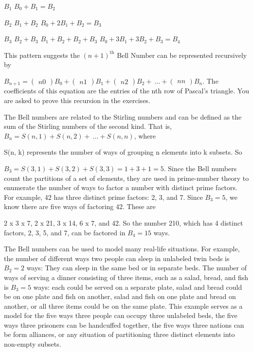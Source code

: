 \documentclass[10pt,letter]{article}
\begin{document}
\(B_{1}\) \(B_{0} + B_{1} = B_{2}\)

\(B_{2}\) \(B_{1} + B_{2}\) \(B_{0} + 2B_{1} + B_{2} = B_{3}\)

\(B_{3}\) \(B_{2} + B_{3}\) \(B_{1} + B_{2} + B_{2} + B_{3}\)
\(B_{0} + 3B_{1} + 3B_{2} + B_{3} = B_{4}\)

This pattern suggests the \({(n + 1)}^{\text{th}}\) Bell Number can be
represented recursively by

\(B_{n + 1} =

\begin{pmatrix}
n 
0 
\end{pmatrix}
B_{0} +

\begin{pmatrix}
n 
1 
\end{pmatrix}
B_{1} +

\begin{pmatrix}
n 
2 
\end{pmatrix}
B_{2} + \ \ldots +

\begin{pmatrix}
n 
n 
\end{pmatrix}
B_{n}\). The coefficients of this equation are the entries
of the nth row of Pascal's triangle. You are asked to prove this
recursion in the exercises.

The Bell numbers are related to the Stirling numbers and can be defined
as the sum of the Stirling numbers of the second kind. That is,
\(B_{n} = S\left( n,1 \right) + S\left( n,2 \right) + \ \ldots + S(n,n)\),
where

S(n, k) represents the number of ways of grouping n elements into k
subsets. So

\(B_{3} = S\left( 3,1 \right) + S\left( 3,2 \right) + S\left( 3,3 \right) = 1 + 3 + 1 = 5.\)
Since the Bell numbers count the partitions of a set of elements, they
are used in prime-number theory to enumerate the number of ways to
factor a number with distinct prime factors. For example, 42 has three
distinct prime factors: 2, 3, and 7. Since \(B_{3} = 5\), we know there
are five ways of factoring 42. These are

2 x 3 x 7, 2 x 21, 3 x 14, 6 x 7, and 42. So the number 210, which has 4
distinct factors, 2, 3, 5, and 7, can be factored in \(B_{4} = 15\)
ways.

The Bell numbers can be used to model many real-life situations. For
example, the number of different ways two people can sleep in unlabeled
twin beds is \(B_{2} = 2\) ways: They can sleep in the same bed or in
separate beds. The number of ways of serving a dinner consisting of
three items, such as a salad, bread, and fish is \(B_{3} = 5\) ways:
each could be served on a separate plate, salad and bread could be on
one plate and fish on another, salad and fish on one plate and bread on
another, or all three items could be on the same plate. This example
serves as a model for the five ways three people can occupy three
unlabeled beds, the five ways three prisoners can be handcuffed
together, the five ways three nations can be form alliances, or any
situation of partitioning three distinct elements into non-empty
subsets.
\end{document}
